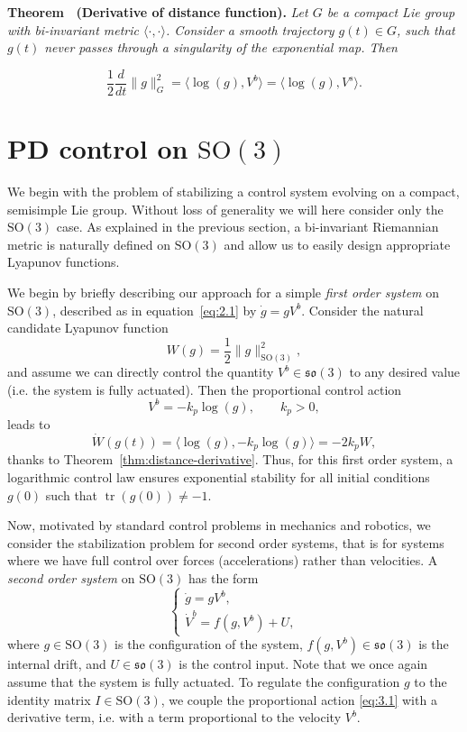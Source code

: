\documentclass[11pt]{article}
\newcommand{\SO}{\mathrm{SO}}
\newcommand{\so}{\mathfrak{so}}
\newcommand{\tr}{\operatorname{tr}}
\newcounter{papertheorem}
\renewcommand{\thepapertheorem}{\arabic{papertheorem}}
\newcommand{\papertheorem}[3]{\refstepcounter{papertheorem}\par\medskip\noindent\textbf{Theorem \thepapertheorem\ (#1).}\label{#2} \textit{#3}\par}
\begin{document}
\papertheorem{Derivative of distance function}{thm:distance-derivative}{Let $G$ be a compact Lie group with bi-invariant metric $\langle\cdot,\cdot\rangle$. Consider a smooth trajectory $g(t)\in G$, such that $g(t)$ never passes through a singularity of the exponential map. Then}
\begin{equation*}
\frac12\frac{d}{dt}\|g\|_G^2=\langle\log(g),V^b\rangle=\langle\log(g),V^s\rangle.
\end{equation*}

\section{PD control on $\SO(3)$}\label{sec:pd-so3}
We begin with the problem of stabilizing a control system evolving on a compact, semisimple Lie group. Without loss of generality we will here consider only the $\SO(3)$ case. As explained in the previous section, a bi-invariant Riemannian metric is naturally defined on $\SO(3)$ and allow us to easily design appropriate Lyapunov functions.

We begin by briefly describing our approach for a simple \emph{first order system} on $\SO(3)$, described as in equation~\eqref{eq:2.1} by $\dot g=gV^b$. Consider the natural candidate Lyapunov function
\begin{equation*}
W(g)=\frac12\|g\|_{\SO(3)}^2,
\end{equation*}
and assume we can directly control the quantity $V^b\in\so(3)$ to any desired value (i.e. the system is fully actuated). Then the proportional control action
\begin{equation*}
V^b=-k_p\log(g),\qquad k_p>0,\tag{3.1}\label{eq:3.1}
\end{equation*}
leads to
\begin{equation*}
\dot W(g(t))=\langle\log(g),-k_p\log(g)\rangle=-2k_pW,
\end{equation*}
thanks to Theorem~\ref{thm:distance-derivative}. Thus, for this first order system, a logarithmic control law ensures exponential stability for all initial conditions $g(0)$ such that $\tr(g(0))\neq-1$.

Now, motivated by standard control problems in mechanics and robotics, we consider the stabilization problem for second order systems, that is for systems where we have full control over forces (accelerations) rather than velocities. A \emph{second order system} on $\SO(3)$ has the form
\begin{equation*}
\begin{cases}
\dot g=gV^b,\\
\dot V^b=f(g,V^b)+U,
\end{cases}\tag{3.2}\label{eq:3.2}
\end{equation*}
where $g\in\SO(3)$ is the configuration of the system, $f(g,V^b)\in\so(3)$ is the internal drift, and $U\in\so(3)$ is the control input. Note that we once again assume that the system is fully actuated. To regulate the configuration $g$ to the identity matrix $I\in\SO(3)$, we couple the proportional action \eqref{eq:3.1} with a derivative term, i.e. with a term proportional to the velocity $V^b$.
\end{document}
